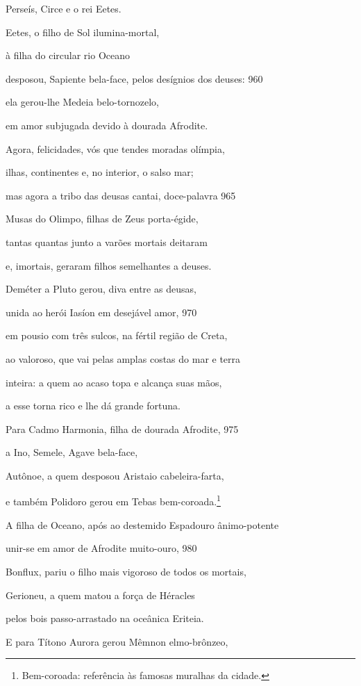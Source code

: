 Perseís, Circe e o rei Eetes.

Eetes, o filho de Sol ilumina-mortal,

à filha do circular rio Oceano

desposou, Sapiente bela-face, pelos desígnios dos deuses: \num{960}

ela gerou-lhe Medeia belo-tornozelo,

em amor subjugada devido à dourada Afrodite.

\medskip

Agora, felicidades, vós que tendes moradas olímpia,

ilhas, continentes e, no interior, o salso mar;

mas agora a tribo das deusas cantai, doce-palavra \num{965}

Musas do Olimpo, filhas de Zeus porta-égide,

tantas quantas junto a varões mortais deitaram

e, imortais, geraram filhos semelhantes a deuses.

\quad{}Deméter a Pluto gerou, diva entre as deusas,

unida ao herói Iasíon em desejável amor, \num{970}

em pousio com três sulcos, na fértil região de Creta,

ao valoroso, que vai pelas amplas costas do mar e terra

inteira: a quem ao acaso topa e alcança suas mãos,

a esse torna rico e lhe dá grande fortuna.

\quad{}Para Cadmo Harmonia, filha de dourada Afrodite, \num{975}

a Ino, Semele, Agave bela-face,

Autônoe, a quem desposou Aristaio cabeleira-farta,

e também Polidoro gerou em Tebas bem-coroada.\footnote{Bem-coroada: referência às famosas muralhas da cidade.}

\quad{}A filha de Oceano, após ao destemido Espadouro ânimo-potente

unir-se em amor de Afrodite muito-ouro, \num{980}

Bonflux, pariu o filho mais vigoroso de todos os mortais,

Gerioneu, a quem matou a força de Héracles

pelos bois passo-arrastado na oceânica Eriteia.

\quad{}E para Títono Aurora gerou Mêmnon elmo-brônzeo,

